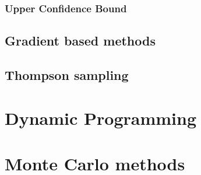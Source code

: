 \documentclass{myclass}
\begin{document}
\subsubsection{Upper Confidence Bound}

\subsection{Gradient based methods}

\subsection{Thompson sampling}

\section{Dynamic Programming}

\section{Monte Carlo methods}
\end{document}

